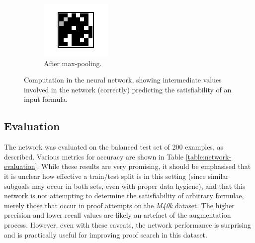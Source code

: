 \documentclass[runningheads]{llncs}
\newcommand{\mizarlarge}{\textit{M40k}}
\begin{document}
\begin{figure}
	\begin{subfigure}{.3\textwidth}
		\centering
		\includegraphics[width=\linewidth]{fc0}
		\caption{After max-pooling.}
	\end{subfigure}
	\caption{Computation in the neural network, showing intermediate values involved in the network (correctly) predicting the satisfiability of an input formula.}
	\label{figure:computation}
\end{figure}

\subsection{Evaluation}
The network was evaluated on the balanced test set of 200 examples, as described.
Various metrics for accuracy are shown in Table \ref{table:network-evaluation}.
While these results are very promising, it should be emphasised that it is unclear how effective a train/test split is in this setting (since similar subgoals may occur in both sets, even with proper data hygiene), and that this network is not attempting to determine the satisfiability of arbitrary formulae, merely those that occur in proof attempts on the \mizarlarge{} dataset.
The higher precision and lower recall values are likely an artefact of the augmentation process.
However, even with these caveats, the network performance is surprising and is practically useful for improving proof search in this dataset.
\end{document}
